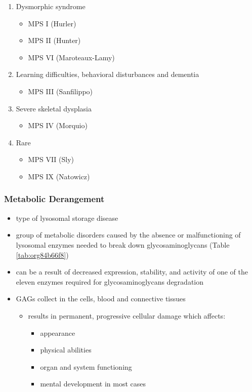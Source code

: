 \documentclass[12pt]{scrartcl}
\begin{document}
\begin{enumerate}
\item Dysmorphic syndrome
\label{sec:org2f44dca}
\begin{itemize}
\item MPS I (Hurler)
\item MPS II (Hunter)
\item MPS VI (Maroteaux-Lamy)
\end{itemize}
\item Learning difficulties, behavioral disturbances and dementia
\label{sec:org8ee3439}
\begin{itemize}
\item MPS III (Sanfilippo)
\end{itemize}
\item Severe skeletal dysplasia
\label{sec:org73d9f3d}
\begin{itemize}
\item MPS IV (Morquio)
\end{itemize}
\item Rare
\label{sec:org76cdfd2}
\begin{itemize}
\item MPS VII (Sly)
\item MPS IX (Natowicz)
\end{itemize}
\end{enumerate}

\subsubsection{Metabolic Derangement}
\label{sec:org2722468}
\begin{itemize}
\item type of lysosomal storage disease
\item group of metabolic disorders caused by the absence or malfunctioning
of lysosomal enzymes needed to break down glycosaminoglycans (Table \ref{tab:org84b66f8})
\item can be a result of decreased expression, stability, and activity of
one of the eleven enzymes required for glycosaminoglycans
degradation
\item GAGs collect in the cells, blood and connective tissues
\begin{itemize}
\item results in permanent, progressive cellular damage which affects:
\begin{itemize}
\item appearance
\item physical abilities
\item organ and system functioning
\item mental development in most cases
\end{itemize}
\end{itemize}
\end{itemize}
\end{document}
